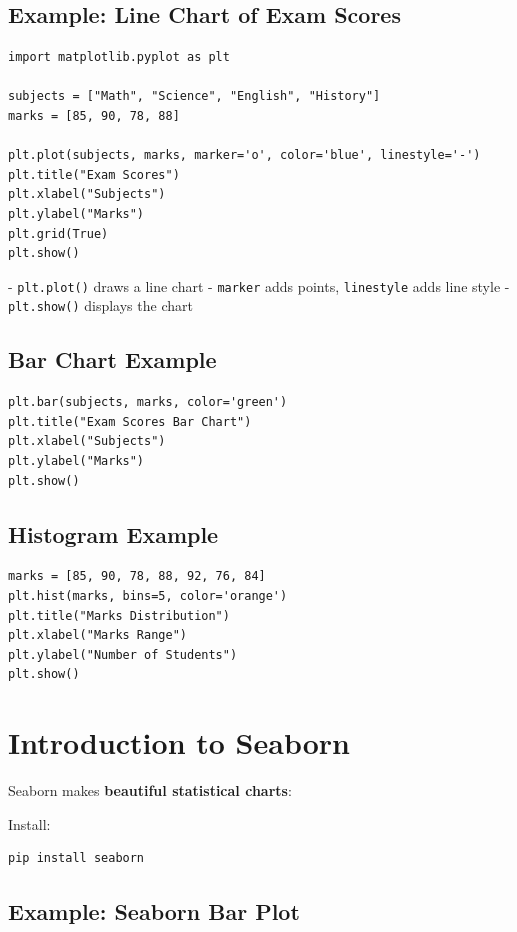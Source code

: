 \subsection{Example: Line Chart of Exam Scores}

\begin{verbatim}
import matplotlib.pyplot as plt

subjects = ["Math", "Science", "English", "History"]
marks = [85, 90, 78, 88]

plt.plot(subjects, marks, marker='o', color='blue', linestyle='-')
plt.title("Exam Scores")
plt.xlabel("Subjects")
plt.ylabel("Marks")
plt.grid(True)
plt.show()
\end{verbatim}

- \texttt{plt.plot()} draws a line chart  
- \texttt{marker} adds points, \texttt{linestyle} adds line style  
- \texttt{plt.show()} displays the chart  

\subsection{Bar Chart Example}

\begin{verbatim}
plt.bar(subjects, marks, color='green')
plt.title("Exam Scores Bar Chart")
plt.xlabel("Subjects")
plt.ylabel("Marks")
plt.show()
\end{verbatim}

\subsection{Histogram Example}

\begin{verbatim}
marks = [85, 90, 78, 88, 92, 76, 84]
plt.hist(marks, bins=5, color='orange')
plt.title("Marks Distribution")
plt.xlabel("Marks Range")
plt.ylabel("Number of Students")
plt.show()
\end{verbatim}

\section{Introduction to Seaborn}

Seaborn makes \textbf{beautiful statistical charts}:

Install:

\begin{verbatim}
pip install seaborn
\end{verbatim}

\subsection{Example: Seaborn Bar Plot}

